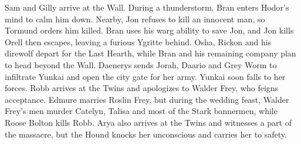 Sam and Gilly arrive at the Wall.
 During a thunderstorm, Bran enters Hodor's mind to calm him down.
 Nearby, Jon refuses to kill an innocent man, so Tormund orders him killed.
 Bran uses his warg ability to save Jon, and Jon kills Orell then escapes, leaving a furious Ygritte behind.
 Osha, Rickon and his direwolf depart for the Last Hearth, while Bran and his remaining company plan to head beyond the Wall.
 Daenerys sends Jorah, Daario and Grey Worm to infiltrate Yunkai and open the city gate for her army.
 Yunkai soon falls to her forces.
 Robb arrives at the Twins and apologizes to Walder Frey, who feigns acceptance.
 Edmure marries Roslin Frey, but during the wedding feast, Walder Frey's men murder Catelyn, Talisa and most of the Stark bannermen, while Roose Bolton kills Robb.
 Arya also arrives at the Twins and witnesses a part of the massacre, but the Hound knocks her unconscious and carries her to safety.
